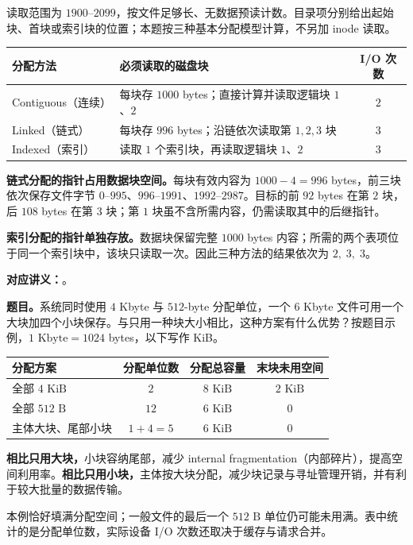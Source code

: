 \begin{checkedsolution}
读取范围为 $1900$--$2099$，按文件足够长、无数据预读计数。目录项分别给出起始块、首块或索引块的位置；本题按三种基本分配模型计算，不另加 inode 读取。

\begin{center}
\begin{tabularx}{\textwidth}{@{}l>{\raggedright\arraybackslash}Xc@{}}
\toprule
分配方法 & 必须读取的磁盘块 & I/O 次数 \\
\midrule
Contiguous（连续） & 每块存 $1000$ bytes；直接计算并读取逻辑块 $1$、$2$ & $2$ \\
Linked（链式） & 每块存 $996$ bytes；沿链依次读取第 $1,2,3$ 块 & $3$ \\
Indexed（索引） & 读取 $1$ 个索引块，再读取逻辑块 $1$、$2$ & $3$ \\
\bottomrule
\end{tabularx}
\end{center}

\textbf{链式分配的指针占用数据块空间。}每块有效内容为 $1000-4=996$ bytes，前三块依次保存文件字节 $0$--$995$、$996$--$1991$、$1992$--$2987$。目标的前 $92$ bytes 在第 $2$ 块，后 $108$ bytes 在第 $3$ 块；第 $1$ 块虽不含所需内容，仍需读取其中的后继指针。

\textbf{索引分配的指针单独存放。}数据块保留完整 $1000$ bytes 内容；所需的两个表项位于同一个索引块中，该块只读取一次。因此三种方法的结果依次为 $\boxed{2,\;3,\;3}$。
\end{checkedsolution}


\textbf{对应讲义：}。

\textbf{题目。}系统同时使用 $4$ Kbyte 与 $512$-byte 分配单位，一个 $6$ Kbyte 文件可用一个大块加四个小块保存。与只用一种块大小相比，这种方案有什么优势？按题目示例，$1\text{ Kbyte}=1024$ bytes，以下写作 KiB。

\begin{checkedsolution}
\begin{center}
\begin{tabular}{@{}lccc@{}}
\toprule
分配方案 & 分配单位数 & 分配总容量 & 末块未用空间 \\
\midrule
全部 $4\text{ KiB}$ & $2$ & $8\text{ KiB}$ & $2\text{ KiB}$ \\
全部 $512\text{ B}$ & $12$ & $6\text{ KiB}$ & $0$ \\
主体大块、尾部小块 & $1+4=5$ & $6\text{ KiB}$ & $0$ \\
\bottomrule
\end{tabular}
\end{center}

\textbf{相比只用大块，}小块容纳尾部，减少 internal fragmentation（内部碎片），提高空间利用率。\textbf{相比只用小块，}主体按大块分配，减少块记录与寻址管理开销，并有利于较大批量的数据传输。

本例恰好填满分配空间；一般文件的最后一个 $512\text{ B}$ 单位仍可能未用满。表中统计的是分配单位数，实际设备 I/O 次数还取决于缓存与请求合并。
\end{checkedsolution}

\endgroup
